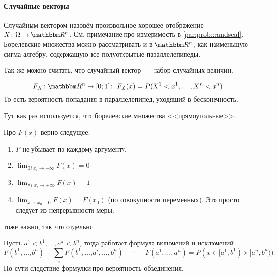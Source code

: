 \documentclass[12pt,timbord]{../../../notes}
\begin{document}
\paragraph{Случайные векторы}
\label{par:stat::randvec}


\begin{defn}\label{defn:prob::randvec::randscal}
  Случайным вектором назовём произвольное хорошее отображение $X\colon \Omega \to \R^n$.
  См. примечание про измеримость в \ref{par:prob::randscal}. Борелевские множества можно рассматривать 
  и в $\R^n$, как наименьшую сигма-алгебру, содержащую все полуоткрытые параллелепипеды.

  Так же можно считать, что случайный вектор~--- набор случайных величин.
\end{defn}


\begin{defn}\label{defn:prob::randvec::distrfun}
  \[
    F_X\colon \R^n\to [0;1] \colon\; F_X(x) = P(X^1 < x^1, \dotsc, X^n < x^n) 
  \]
  То есть вероятность попадания в параллелепипед, уходящий в бесконечность.
\end{defn}
\begin{rem}\label{rem:stat::randvec::distr}
Тут как раз используется, что борелевские множества <<прямоугольные>>.
\end{rem}


\begin{prop}\label{prop:stat::randscal::distrfun}
  Про $F(x)$ верно следущее:
  \begin{enumerate}
    \item $F$ не убывает по каждому аргументу.
    \item $\displaystyle\lim_{\exists\, i\; x_i\to -\infty}F(x) = 0$
    \item $\displaystyle\lim_{\forall\,i \; x_i\to +\infty}F(x) = 1$
    \item $\displaystyle\lim_{x\to x_0-0}F(x) = F(x_0)$ (по совокупности переменных).
      Это просто следует из непрерывности меры.
  \end{enumerate}
\end{prop}

тоже важно, так что отдельно

\begin{prop}\label{prop:stat::randvec::inc}
  Пусть $a^1 < b^1, \dotsc, a^n < b^n$, тогда работает формула включений и исключений
  \[
    F(b^1, \dotsc, b^n) - \sum_i F(b^1, \dotsc, a^i, \dotsc, b^n) + \dotsb + F(a^1, \dotsc, a^n) = 
  P(x \in [a^1, b^1)\times[a^n,b^n))
  \]
  По сути следствие формулки про вероятность объединения.
\end{prop}
\end{document}
